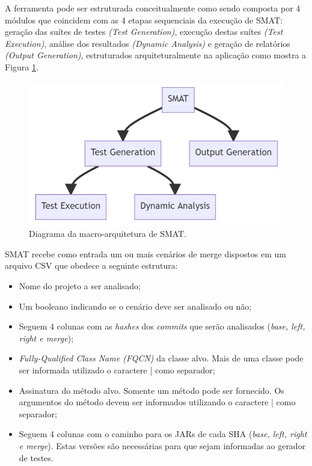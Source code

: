 \documentclass[12pt]{article}
\begin{document}
A ferramenta pode ser estruturada conceitualmente como sendo composta por 4 módulos que coincidem com as 4 etapas sequenciais da execução de SMAT: geração das suítes de testes \textit{(Test Generation)}, execução destas suítes \textit{(Test Execution)}, análise dos resultados \textit{(Dynamic Analysis)} e geração de relatórios \textit{(Output Generation)}, estruturados arquiteturalmente na aplicação como mostra a Figura \ref{fig:macro-velha}.

\begin{figure}[H]
    \centering
    \includegraphics[width=.8\textwidth]{imagens/arquitetura-velha.png}
    \caption{Diagrama da macro-arquitetura de SMAT.}
    \label{fig:macro-velha}
\end{figure}

SMAT recebe como entrada um ou mais cenários de merge dispostos em um arquivo CSV que obedece a seguinte estrutura:

\begin{itemize}
    \item Nome do projeto a ser analisado;
    \item Um booleano indicando se o cenário deve ser analisado ou não;
    \item Seguem 4 colunas com as \textit{hashes} dos \textit{commits} que serão analisados (\textit{base, left, right e merge});
    \item \textit{Fully-Qualified Class Name (FQCN)} da classe alvo. Mais de uma classe pode ser informada utilizado o caractere | como separador;
    \item Assinatura do método alvo. Somente um método pode ser fornecido. Os argumentos do método devem ser informados utilizando o caractere | como separador;
    \item Seguem 4 colunas com o caminho para os JARs de cada SHA (\textit{base, left, right e merge}). Estas versões são necessárias para que sejam informadas ao gerador de testes.
\end{itemize}
\end{document}
